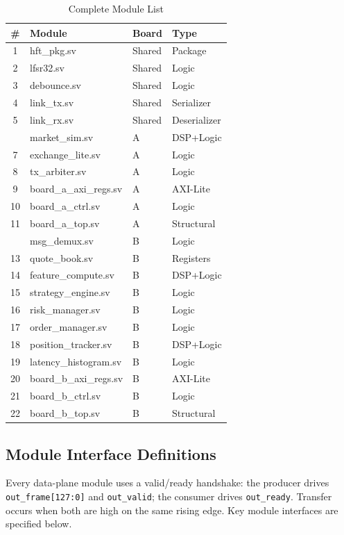 \documentclass[conference]{IEEEtran}
\begin{document}
\begin{table}[h]
\centering
\caption{Complete Module List}
\label{tab:modules}
\begin{tabular}{@{}clll@{}}
\toprule
\textbf{\#} & \textbf{Module} & \textbf{Board} & \textbf{Type} \\
\midrule
1 & hft\_pkg.sv & Shared & Package \\
2 & lfsr32.sv & Shared & Logic \\
3 & debounce.sv & Shared & Logic \\
4 & link\_tx.sv & Shared & Serializer \\
5 & link\_rx.sv & Shared & Deserializer \\
\addlinespace
6 & market\_sim.sv & A & DSP+Logic \\
7 & exchange\_lite.sv & A & Logic \\
8 & tx\_arbiter.sv & A & Logic \\
9 & board\_a\_axi\_regs.sv & A & AXI-Lite \\
10 & board\_a\_ctrl.sv & A & Logic \\
11 & board\_a\_top.sv & A & Structural \\
\addlinespace
12 & msg\_demux.sv & B & Logic \\
13 & quote\_book.sv & B & Registers \\
14 & feature\_compute.sv & B & DSP+Logic \\
15 & strategy\_engine.sv & B & Logic \\
16 & risk\_manager.sv & B & Logic \\
17 & order\_manager.sv & B & Logic \\
18 & position\_tracker.sv & B & DSP+Logic \\
19 & latency\_histogram.sv & B & Logic \\
20 & board\_b\_axi\_regs.sv & B & AXI-Lite \\
21 & board\_b\_ctrl.sv & B & Logic \\
22 & board\_b\_top.sv & B & Structural \\
\bottomrule
\end{tabular}
\end{table}

\subsection{Module Interface Definitions}

Every data-plane module uses a valid/ready handshake: the producer drives \texttt{out\_frame[127:0]} and \texttt{out\_valid}; the consumer drives \texttt{out\_ready}. Transfer occurs when both are high on the same rising edge. Key module interfaces are specified below.
\end{document}
